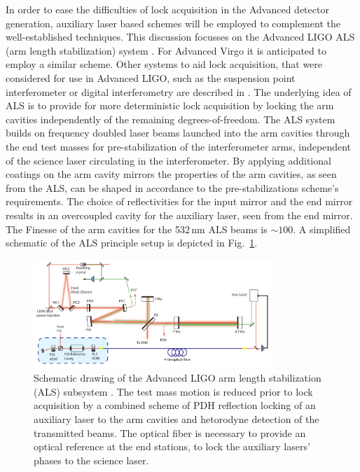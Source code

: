 In order to ease the difficulties of lock acquisition in the Advanced detector generation, auxiliary laser based schemes will be employed to complement the well-established techniques.
This discussion focusses on the Advanced LIGO ALS (arm length stabilization) system \cite{aLIGO_ALS_Design}. For Advanced Virgo it is anticipated to employ a similar scheme. 
Other systems to aid lock acquisition, that were considered for use in Advanced LIGO, such as the suspension point interferometer or digital interferometry are described in \cite{LIGO_T080139}.
The underlying idea of ALS is to provide for more deterministic lock acquisition by locking the arm cavities independently of the remaining degrees-of-freedom.
The ALS system builds on frequency doubled laser beams launched into the arm cavities through the end test masses for pre-stabilization of the interferometer arms,
independent of the science laser circulating in the interferometer. By applying additional coatings on the arm cavity mirrors the properties of the arm cavities, 
as seen from the ALS, can be shaped in accordance to the pre-stabilizations scheme's requirements. The choice of reflectivities for the input mirror and the end mirror 
results in an overcoupled cavity for the auxiliary laser, seen from the end mirror. The Finesse of the arm cavities for the 532\,nm ALS beams is $\sim100$. 
A simplified schematic of the ALS principle setup is depicted in Fig.~\ref{Fig:Sec_Optics_AdvLIGO_ALS_Schematic}.

\begin{figure}[th]
\centering
\includegraphics[width=0.8\textwidth]{Sec_Optics/aLIGO_ALS_Schematic}
\caption{Schematic drawing of the Advanced LIGO arm length stabilization (ALS) subsystem \cite{aLIGO_ALS_Design}. The test mass motion is reduced prior to lock acquisition by a combined scheme
of PDH reflection locking of an auxiliary laser to the arm cavities and hetorodyne detection of the transmitted beams. The optical fiber is necessary to provide an optical reference at the end 
stations, to lock the auxiliary lasers' phases to the science laser.}
\label{Fig:Sec_Optics_AdvLIGO_ALS_Schematic}   
\end{figure}

